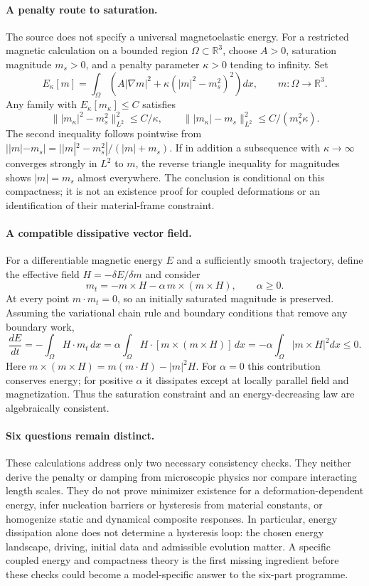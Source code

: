 \documentclass[11pt]{article}
\begin{document}
\paragraph{A penalty route to saturation.}
The source does not specify a universal magnetoelastic energy. For a restricted magnetic calculation on a bounded region $\Omega\subset\mathbb R^3$, choose $A>0$, saturation magnitude $m_s>0$, and a penalty parameter $\kappa>0$ tending to infinity. Set
\[
 E_\kappa[m]=\int_\Omega\left(A|\nabla m|^2+
                 \kappa(|m|^2-m_s^2)^2\right)dx,
 \qquad m:\Omega\to\mathbb R^3.
\]
Any family with $E_\kappa[m_\kappa]\leq C$ satisfies
\[
 \bigl\||m_\kappa|^2-m_s^2\bigr\|_{L^2}^2\leq C/\kappa,
 \qquad
 \bigl\||m_\kappa|-m_s\bigr\|_{L^2}^2
 \leq C/(m_s^2\kappa).
\]
The second inequality follows pointwise from
$||m|-m_s|=||m|^2-m_s^2|/(|m|+m_s)$.
If in addition a subsequence with $\kappa\to\infty$ converges strongly in $L^2$ to $m$, the reverse triangle inequality for magnitudes shows $|m|=m_s$ almost everywhere. The conclusion is conditional on this compactness; it is not an existence proof for coupled deformations or an identification of their material-frame constraint.

\paragraph{A compatible dissipative vector field.}
For a differentiable magnetic energy $E$ and a sufficiently smooth trajectory, define the effective field $H=-\delta E/\delta m$ and consider
\[
 m_t=-m\times H-\alpha\,m\times(m\times H),\qquad\alpha\geq0.
\]
At every point $m\cdot m_t=0$, so an initially saturated magnitude is preserved. Assuming the variational chain rule and boundary conditions that remove any boundary work,
\[
 \frac{dE}{dt}=-\int_\Omega H\cdot m_t\,dx
 =\alpha\int_\Omega H\cdot[m\times(m\times H)]\,dx
 =-\alpha\int_\Omega|m\times H|^2dx\leq0.
\]
Here $m\times(m\times H)=m(m\cdot H)-|m|^2H$. For $\alpha=0$ this contribution conserves energy; for positive $\alpha$ it dissipates except at locally parallel field and magnetization. Thus the saturation constraint and an energy-decreasing law are algebraically consistent.

\paragraph{Six questions remain distinct.}
These calculations address only two necessary consistency checks. They neither derive the penalty or damping from microscopic physics nor compare interacting length scales. They do not prove minimizer existence for a deformation-dependent energy, infer nucleation barriers or hysteresis from material constants, or homogenize static and dynamical composite responses. In particular, energy dissipation alone does not determine a hysteresis loop: the chosen energy landscape, driving, initial data and admissible evolution matter. A specific coupled energy and compactness theory is the first missing ingredient before these checks could become a model-specific answer to the six-part programme.
\end{document}
